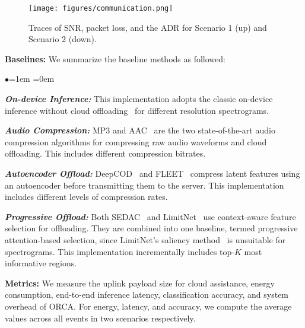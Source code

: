 \begin{figure}[tp]
    \centering
    \texttt{[image: figures/communication.png]}
    \vspace{-0.8cm}
    \caption{Traces of SNR, packet loss, and the ADR for Scenario 1 (up) and Scenario 2 (down). }
    \label{fig:testbed-communication}
    \vspace{-0.3cm}
\end{figure}

\noindent
\textbf{Baselines:} We summarize the baseline methods as followed:

\begin{list}{$\bullet$}{\leftmargin=1em \itemindent=0em}
\item \textbf{\textit{On-device Inference:}} This implementation adopts the classic on-device inference without cloud offloading~\cite{gobieski2019intelligence,lee2019intermittent} for different resolution spectrograms. 

\item \textbf{\textit{Audio Compression:}} MP3 and AAC~\cite{tomar2006converting} are the two state-of-the-art audio compression algorithms for compressing raw audio waveforms and cloud offloading. This includes different compression bitrates. 

\item \textbf{\textit{Autoencoder Offload:}} DeepCOD~\cite{yao2020deep} and FLEET~\cite{huang2023rethink} compress latent features using an autoencoder before transmitting them to the server. This implementation includes different levels of compression rates. 

\item \textbf{\textit{Progressive Offload:}} Both SEDAC~\cite{ahn2024split} and LimitNet~\cite{hojjat2024limitnet} use context-aware feature selection for offloading. They are combined into one baseline, termed progressive attention-based selection, since LimitNet’s saliency method~\cite{hojjat2024limitnet} is unsuitable for spectrograms. This implementation incrementally includes top-$K$ most informative regions.

\end{list}

\noindent
\textbf{Metrics:} We measure the uplink payload size for cloud assistance, energy consumption, end-to-end inference latency, classification accuracy, and system overhead of ORCA. For energy, latency, and accuracy, we compute the average values across all events in two scenarios respectively.



